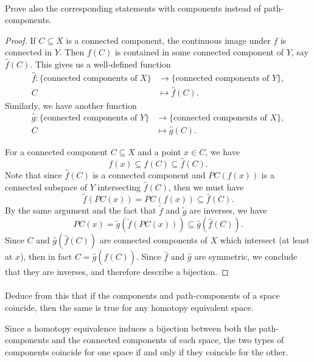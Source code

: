 \documentclass[12pt]{article}
\newlength{\myparskip}
\newenvironment{fullbox}{\begin{lrbox}{\savefullbox}\begin{minipage}{\dimexpr\textwidth-2\fboxsep\relax}\setlength{\parskip}{\myparskip}}{\end{minipage}\end{lrbox}\framebox[\textwidth]{\usebox{\savefullbox}}}
\newenvironment{pbox}[1][]{\begin{fullbox}\ifx#1\empty\else\paragraph{#1}\phantom{}\fi}{\end{fullbox}}
\theoremstyle{definition}
\newcommand{\<}{\langle}
\renewcommand{\>}{\rangle}
\newcommand{\seq}{\subseteq}
\begin{document}
\begin{pbox}
    Prove also the corresponding statements with components instead of path-components.
\end{pbox}

\begin{proof}
    If $C \seq X$ is a connected component, the continuous image under $f$ is connected in $Y$.
    Then $f(C)$ is contained in some connected component of $Y$, say $\hat{f}(C)$.
    This gives us a well-defined function
    \begin{align*}
        \hat{f} : \{\text{connected components of } X\} &\longrightarrow \{\text{connected components of } Y\}, \\
            C &\longmapsto \hat{f}(C).
    \end{align*}
    Similarly, we have another function
    \begin{align*}
        \hat{g} : \{\text{connected components of } Y\} &\longrightarrow \{\text{connected components of } X\}, \\
            C &\longmapsto \hat{g}(C).
    \end{align*}

    For a connected component $C \seq X$ and a point $x \in C$, we have
    \[
        f(x) \seq f(C) \seq \hat{f}(C).
    \]
    Note that since $\hat{f}(C)$ is a connected component and $PC(f(x))$ is a connected subspace of $Y$ intersecting $\hat{f}(C)$, then we must have
    \[
        \tilde{f}(PC(x)) = PC(f(x)) \seq \hat{f}(C).
    \]
    By the same argument and the fact that $\tilde{f}$ and $\tilde{g}$ are inverses, we have
    \[
        PC(x) = \tilde{g}(\tilde{f}(PC(x))) \subseteq \hat{g}(\hat{f}(C)).
    \]
    Since $C$ and $\hat{g}(\hat{f}(C))$ are connected components of $X$ which intersect (at least at $x$), then in fact $C = \hat{g}(\hat{f}(C))$.
    Since $\hat{f}$ and $\hat{g}$ are symmetric, we conclude that they are inverses, and therefore describe a bijection.
\end{proof}

\begin{pbox}
    Deduce from this that if the components and path-components of a space coincide, then the same is true for any homotopy equivalent space.
\end{pbox}

Since a homotopy equivalence induces a bijection between both the path-components and the connected components of each space, the two types of components coincide for one space if and only if they coincide for the other.
\end{document}
